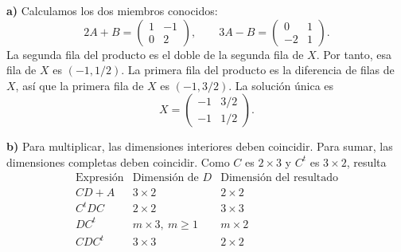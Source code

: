 \textbf{a)} Calculamos los dos miembros conocidos:
\[
2A+B=\begin{pmatrix}1&-1\\0&2\end{pmatrix},
\qquad 3A-B=\begin{pmatrix}0&1\\-2&1\end{pmatrix}.
\]
La segunda fila del producto es el doble de la segunda fila de $X$. Por tanto, esa fila de $X$ es $(-1,1/2)$. La primera fila del producto es la diferencia de filas de $X$, así que la primera fila de $X$ es $(-1,3/2)$. La solución única es
\[
X=\boxed{\begin{pmatrix}-1&3/2\\-1&1/2\end{pmatrix}}.
\]

\textbf{b)} Para multiplicar, las dimensiones interiores deben coincidir. Para sumar, las dimensiones completas deben coincidir. Como $C$ es $2\times3$ y $C^t$ es $3\times2$, resulta
\[
\begin{array}{c|c|c}
\text{Expresión}&\text{Dimensión de }D&\text{Dimensión del resultado}\\\hline
CD+A&3\times2&2\times2\\
C^tDC&2\times2&3\times3\\
DC^t&m\times3,\ m\ge1&m\times2\\
CDC^t&3\times3&2\times2
\end{array}
\]

